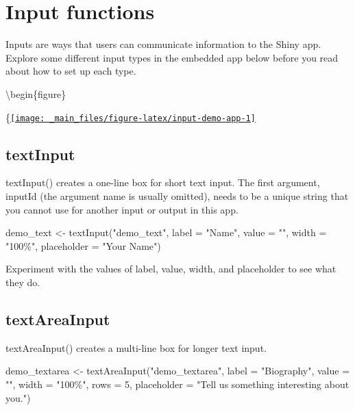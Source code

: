 \documentclass[
]{book}
\newenvironment{Shaded}{\begin{snugshade}}{\end{snugshade}}
\newcommand{\AttributeTok}[1]{\textcolor[rgb]{0.77,0.63,0.00}{#1}}
\newcommand{\DecValTok}[1]{\textcolor[rgb]{0.00,0.00,0.81}{#1}}
\newcommand{\FunctionTok}[1]{\textcolor[rgb]{0.00,0.00,0.00}{#1}}
\newcommand{\NormalTok}[1]{#1}
\newcommand{\OtherTok}[1]{\textcolor[rgb]{0.56,0.35,0.01}{#1}}
\newcommand{\StringTok}[1]{\textcolor[rgb]{0.31,0.60,0.02}{#1}}
\begin{document}
\hypertarget{input-functions}{%
\section{Input functions}\label{input-functions}}

Inputs are ways that users can communicate information to the Shiny app. Explore some different input types in the embedded app below before you read about how to set up each type.

\textbackslash begin\{figure\}

\{\centering \href{https://shiny.psy.gla.ac.uk/debruine/input_demo/}{\texttt{[image: \_main\_files/figure-latex/input-demo-app-1]} }

\hypertarget{textinput}{%
\subsection{textInput}\label{textinput}}

textInput() creates a one-line box for short text input. The first argument, inputId (the argument name is usually omitted), needs to be a unique string that you cannot use for another input or output in this app.

\begin{Shaded}
\begin{Highlighting}[]
\NormalTok{demo\_text }\OtherTok{\textless{}{-}} 
  \FunctionTok{textInput}\NormalTok{(}\StringTok{"demo\_text"}\NormalTok{, }
            \AttributeTok{label =} \StringTok{"Name"}\NormalTok{, }
            \AttributeTok{value =} \StringTok{""}\NormalTok{, }
            \AttributeTok{width =} \StringTok{"100\%"}\NormalTok{,}
            \AttributeTok{placeholder =} \StringTok{"Your Name"}\NormalTok{)}
\end{Highlighting}
\end{Shaded}

Experiment with the values of label, value, width, and placeholder to see what they do.

\hypertarget{textareainput}{%
\subsection{textAreaInput}\label{textareainput}}

textAreaInput() creates a multi-line box for longer text input.

\begin{Shaded}
\begin{Highlighting}[]
\NormalTok{demo\_textarea }\OtherTok{\textless{}{-}} 
  \FunctionTok{textAreaInput}\NormalTok{(}\StringTok{"demo\_textarea"}\NormalTok{, }
                \AttributeTok{label =} \StringTok{"Biography"}\NormalTok{, }
                \AttributeTok{value =} \StringTok{""}\NormalTok{,}
                \AttributeTok{width =} \StringTok{"100\%"}\NormalTok{,}
                \AttributeTok{rows =} \DecValTok{5}\NormalTok{, }
                \AttributeTok{placeholder =} \StringTok{"Tell us something interesting about you."}\NormalTok{)}
\end{Highlighting}
\end{Shaded}
\end{document}
